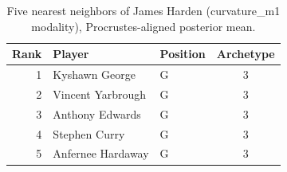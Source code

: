 \begin{table}[htbp]
  \centering\small
  \begin{tabular}{rllc}
    \toprule
    Rank & Player & Position & Archetype \\
    \midrule
    1 & Kyshawn George & G & 3 \\
    2 & Vincent Yarbrough & G & 3 \\
    3 & Anthony Edwards & G & 3 \\
    4 & Stephen Curry & G & 3 \\
    5 & Anfernee Hardaway & G & 3 \\
    \bottomrule
  \end{tabular}
  \caption{Five nearest neighbors of James Harden (curvature_m1 modality), Procrustes-aligned posterior mean.}
  \label{tab:James_Harden_neighbors_curvature_m1}
\end{table}

